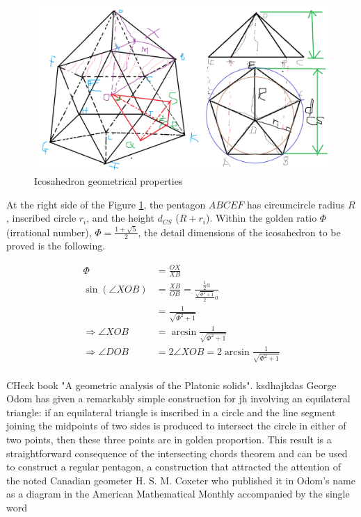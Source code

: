 \begin{figure}[h]
\centering
	\includegraphics[width=\textwidth]{image/icosaGeo2.png}
%	
	\caption{Icosahedron geometrical properties}
	\label{fig:icosaGeo1}
\end{figure}

\noindent At the right side of  the Figure \ref{fig:icosaGeo1}, the pentagon $ABCEF$ has circumcircle radius $R$, inscribed circle $r_i$, and the height $d_{CS}$ ($R+r_i$).
Within the golden ratio $\Phi$ (irrational number), $\Phi = \frac{1+\sqrt{5}}{2}$, the detail dimensions of the icosahedron to be proved is the following. 

\begin{equation*} 
\label{icosa:eq1}
\begin{split}
\Phi & = \frac{OX}{XB}\\
\sin(\angle XOB) & = \frac{XB}{OB} = \frac{\frac{1}{2}a}{\frac{\sqrt{\Phi^2+1}}{2}a}\\
				 & = \frac{1}{\sqrt{\Phi^2 + 1}}\\
\Rightarrow \angle{XOB} & = \arcsin{\frac{1}{\sqrt{\Phi^2 + 1}}}\\
\Rightarrow \angle{DOB} & = 2\angle{XOB} = 2\arcsin{\frac{1}{\sqrt{\Phi^2 + 1}}}\\
\end{split}
\end{equation*}

 CHeck book "A geometric analysis of the Platonic solids". ksdhajkdas
George Odom has given a remarkably simple construction for jh involving an equilateral triangle: if an equilateral triangle is inscribed in a circle and the line segment joining the midpoints of two sides is produced to intersect the circle in either of two points, then these three points are in golden proportion. This result is a straightforward consequence of the intersecting chords theorem and can be used to construct a regular pentagon, a construction that attracted the attention of the noted Canadian geometer H. S. M. Coxeter who published it in Odom's name as a diagram in the American Mathematical Monthly accompanied by the single word

